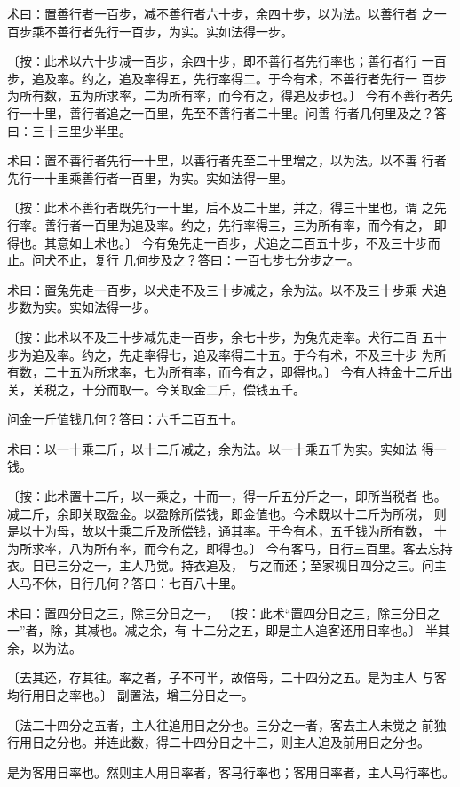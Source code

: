 \documentclass[a4paper,12pt,UTF8,twoside]{ctexbook}
\begin{document}
术曰：置善行者一百步，减不善行者六十步，余四十步，以为法。以善行者 之一百步乘不善行者先行一百步，为实。实如法得一步。

〔按：此术以六十步减一百步，余四十步，即不善行者先行率也；善行者行 一百步，追及率。约之，追及率得五，先行率得二。于今有术，不善行者先行一 百步为所有数，五为所求率，二为所有率，而今有之，得追及步也。〕 今有不善行者先行一十里，善行者追之一百里，先至不善行者二十里。问善 行者几何里及之？答曰：三十三里少半里。

术曰：置不善行者先行一十里，以善行者先至二十里增之，以为法。以不善 行者先行一十里乘善行者一百里，为实。实如法得一里。

〔按：此术不善行者既先行一十里，后不及二十里，并之，得三十里也，谓 之先行率。善行者一百里为追及率。约之，先行率得三，三为所有率，而今有之， 即得也。其意如上术也。〕 今有兔先走一百步，犬追之二百五十步，不及三十步而止。问犬不止，复行 几何步及之？答曰：一百七步七分步之一。

术曰：置兔先走一百步，以犬走不及三十步减之，余为法。以不及三十步乘 犬追步数为实。实如法得一步。

〔按：此术以不及三十步减先走一百步，余七十步，为兔先走率。犬行二百 五十步为追及率。约之，先走率得七，追及率得二十五。于今有术，不及三十步 为所有数，二十五为所求率，七为所有率，而今有之，即得也。〕 今有人持金十二斤出关，关税之，十分而取一。今关取金二斤，偿钱五千。

问金一斤值钱几何？答曰：六千二百五十。

术曰：以一十乘二斤，以十二斤减之，余为法。以一十乘五千为实。实如法 得一钱。

〔按：此术置十二斤，以一乘之，十而一，得一斤五分斤之一，即所当税者 也。减二斤，余即关取盈金。以盈除所偿钱，即金值也。今术既以十二斤为所税， 则是以十为母，故以十乘二斤及所偿钱，通其率。于今有术，五千钱为所有数， 十为所求率，八为所有率，而今有之，即得也。〕 今有客马，日行三百里。客去忘持衣。日已三分之一，主人乃觉。持衣追及， 与之而还；至家视日四分之三。问主人马不休，日行几何？答曰：七百八十里。

术曰：置四分日之三，除三分日之一， 〔按：此术“置四分日之三，除三分日之一”者，除，其减也。减之余，有 十二分之五，即是主人追客还用日率也。〕 半其余，以为法。

〔去其还，存其往。率之者，子不可半，故倍母，二十四分之五。是为主人 与客均行用日之率也。〕 副置法，增三分日之一。

〔法二十四分之五者，主人往追用日之分也。三分之一者，客去主人未觉之 前独行用日之分也。并连此数，得二十四分日之十三，则主人追及前用日之分也。

是为客用日率也。然则主人用日率者，客马行率也；客用日率者，主人马行率也。
\end{document}

